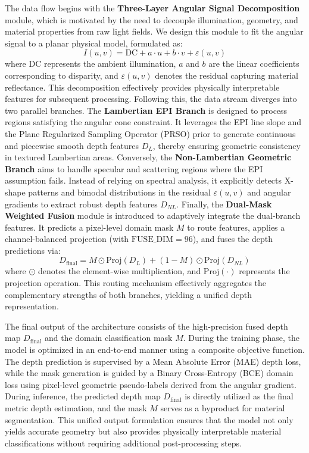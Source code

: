 The data flow begins with the \textbf{Three-Layer Angular Signal Decomposition} module, which is motivated by the need to decouple illumination, geometry, and material properties from raw light fields. We design this module to fit the angular signal to a planar physical model, formulated as:
\begin{equation}
\label{eq:eq1}
I(u,v) = \text{DC} + a \cdot u + b \cdot v + \varepsilon(u,v)
\end{equation}
where $\text{DC}$ represents the ambient illumination, $a$ and $b$ are the linear coefficients corresponding to disparity, and $\varepsilon(u,v)$ denotes the residual capturing material reflectance. This decomposition effectively provides physically interpretable features for subsequent processing. Following this, the data stream diverges into two parallel branches. The \textbf{Lambertian EPI Branch} is designed to process regions satisfying the angular cone constraint. It leverages the EPI line slope and the Plane Regularized Sampling Operator (PRSO) prior to generate continuous and piecewise smooth depth features $D_L$, thereby ensuring geometric consistency in textured Lambertian areas. Conversely, the \textbf{Non-Lambertian Geometric Branch} aims to handle specular and scattering regions where the EPI assumption fails. Instead of relying on spectral analysis, it explicitly detects X-shape patterns and bimodal distributions in the residual $\varepsilon(u,v)$ and angular gradients to extract robust depth features $D_{NL}$. Finally, the \textbf{Dual-Mask Weighted Fusion} module is introduced to adaptively integrate the dual-branch features. It predicts a pixel-level domain mask $M$ to route features, applies a channel-balanced projection (with $\text{FUSE\_DIM}=96$), and fuses the depth predictions via:
\begin{equation}
\label{eq:eq2}
D_{\text{final}} = M \odot \text{Proj}(D_L) + (1 - M) \odot \text{Proj}(D_{NL})
\end{equation}
where $\odot$ denotes the element-wise multiplication, and $\text{Proj}(\cdot)$ represents the projection operation. This routing mechanism effectively aggregates the complementary strengths of both branches, yielding a unified depth representation.

The final output of the architecture consists of the high-precision fused depth map $D_{\text{final}}$ and the domain classification mask $M$. During the training phase, the model is optimized in an end-to-end manner using a composite objective function. The depth prediction is supervised by a Mean Absolute Error (MAE) depth loss, while the mask generation is guided by a Binary Cross-Entropy (BCE) domain loss using pixel-level geometric pseudo-labels derived from the angular gradient. During inference, the predicted depth map $D_{\text{final}}$ is directly utilized as the final metric depth estimation, and the mask $M$ serves as a byproduct for material segmentation. This unified output formulation ensures that the model not only yields accurate geometry but also provides physically interpretable material classifications without requiring additional post-processing steps.

